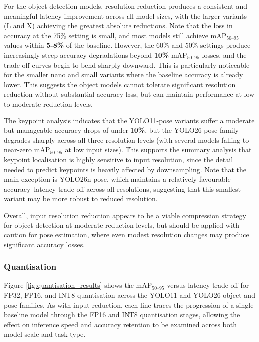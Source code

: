 For the object detection models, resolution reduction produces a consistent and meaningful latency improvement across all model sizes, with the larger variants (L and X) achieving the greatest absolute reductions. Note that the loss in accuracy at the 75\% setting is small, and most models still achieve mAP$_{50\text{--}95}$ values within \textbf{5-8\%} of the baseline. However, the 60\% and 50\% settings produce increasingly steep accuracy degradations beyond \textbf{10\%} mAP$_{50\text{--}95}$ losses, and the trade-off curves begin to bend sharply downward. This is particularly noticeable for the smaller nano and small variants where the baseline accuracy is already lower. This suggests the object models cannot tolerate significant resolution reduction without substantial accuracy loss, but can maintain performance at low to moderate reduction levels.

The keypoint analysis indicates that the YOLO11-pose variants suffer a moderate but manageable accuracy drops of under \textbf{10\%}, but the YOLO26-pose family degrades sharply across all three resolution levels (with several models falling to near-zero mAP$_{50\text{--}95}$ at low input sizes). This supports the summary analysis that keypoint localisation is highly sensitive to input resolution, since the detail needed to predict keypoints is heavily affected by downsampling. Note that the main exception is YOLO26n-pose, which maintains a relatively favourable accuracy--latency trade-off across all resolutions, suggesting that this smallest variant may be more robust to reduced resolution.

Overall, input resolution reduction appears to be a viable compression strategy for object detection at moderate reduction levels, but should be applied with caution for pose estimation, where even modest resolution changes may produce significant accuracy losses.


\subsubsection{Quantisation}

Figure \ref{fig:quantisation_results} shows the mAP$_{50\text{--}95}$ versus latency trade-off for FP32, FP16, and INT8 quantisation across the YOLO11 and YOLO26 object and pose families. As with input reduction, each line traces the progression of a single baseline model through the FP16 and INT8 quantisation stages, allowing the effect on inference speed and accuracy retention to be examined across both model scale and task type.

